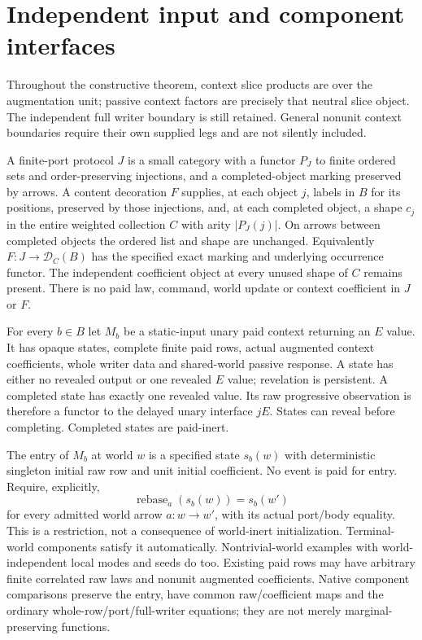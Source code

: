 \documentclass[11pt]{article}\usepackage{amsmath,amssymb,amsthm,geometry}\geometry{margin=1in}
\begin{document}
\section{Independent input and component interfaces}
Throughout the constructive theorem, context slice products are over the augmentation unit; passive context factors are precisely that neutral slice object. The independent full writer boundary is still retained. General nonunit context boundaries require their own supplied legs and are not silently included.

A finite-port protocol $J$ is a small category with a functor $P_J$ to finite ordered sets and order-preserving injections, and a completed-object marking preserved by arrows. A content decoration $F$ supplies, at each object $j$, labels in $B$ for its positions, preserved by those injections, and, at each completed object, a shape $c_j$ in the entire weighted collection $C$ with arity $|P_J(j)|$. On arrows between completed objects the ordered list and shape are unchanged. Equivalently $F:J\to\mathcal D_C(B)$ has the specified exact marking and underlying occurrence functor. The independent coefficient object at every unused shape of $C$ remains present. There is no paid law, command, world update or context coefficient in $J$ or $F$.

For every $b\in B$ let $M_b$ be a static-input unary paid context returning an $E$ value. It has opaque states, complete finite paid rows, actual augmented context coefficients, whole writer data and shared-world passive response. A state has either no revealed output or one revealed $E$ value; revelation is persistent. A completed state has exactly one revealed value. Its raw progressive observation is therefore a functor to the delayed unary interface $jE$. States can reveal before completing. Completed states are paid-inert.

The entry of $M_b$ at world $w$ is a specified state $s_b(w)$ with deterministic singleton initial raw row and unit initial coefficient. No event is paid for entry. Require, explicitly,
\[
 \operatorname{rebase}_a(s_b(w))=s_b(w')                 \tag{1}
\]
for every admitted world arrow $a:w\to w'$, with its actual port/body equality. This is a restriction, not a consequence of world-inert initialization. Terminal-world components satisfy it automatically. Nontrivial-world examples with world-independent local modes and seeds do too. Existing paid rows may have arbitrary finite correlated raw laws and nonunit augmented coefficients. Native component comparisons preserve the entry, have common raw/coefficient maps and the ordinary whole-row/port/full-writer equations; they are not merely marginal-preserving functions.
\end{document}
